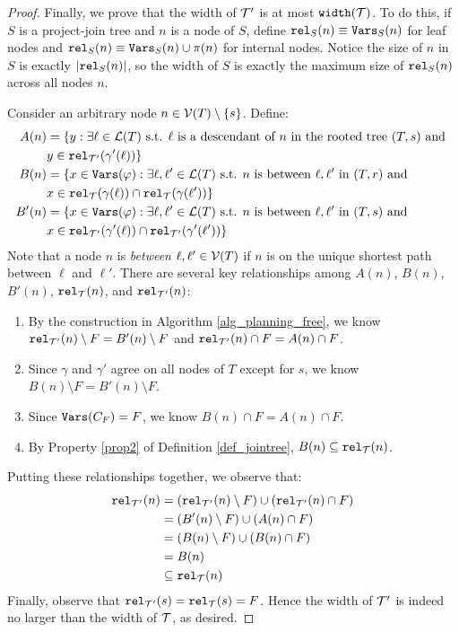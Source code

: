 \begin{proof}
Finally, we prove that the width of $\mathcal{T}'$ is at most $\texttt{\upshape width}(\mathcal{T})$. 
To do this, if $S$ is a project-join tree and $n$ is a node of $S$, define $\texttt{\upshape rel}_S(n) \equiv \texttt{\upshape Vars}_S(n)$ for leaf nodes and $\texttt{\upshape rel}_S(n) \equiv \texttt{\upshape Vars}_S(n) \cup \pi(n)$ for internal nodes. Notice the size of $n$ in $S$ is exactly $|\texttt{\upshape rel}_S(n)|$, so the width of $S$ is exactly the maximum size of $\texttt{\upshape rel}_S(n)$ across all nodes $n$. 

Consider an arbitrary node $n \in \mathcal{V}(T) \setminus \{s\}$. Define:
\begin{align*}
    A(n) &= \{ y : \exists \ell \in \mathcal{L}(T) \text{ s.t. $\ell$ is a descendant of $n$ in the rooted tree $(T, s)$ and } \\&y \in \texttt{\upshape rel}_{\mathcal{T}'}(\gamma'(\ell)) \} \\
    B(n) &= \{ x \in \texttt{\upshape Vars}(\varphi) : \exists \ell, \ell' \in \mathcal{L}(T) \text{ s.t. $n$ is between $\ell, \ell'$ in $(T, r)$ and } \\&x \in \texttt{\upshape rel}_{\mathcal{T}}(\gamma(\ell)) \cap \texttt{\upshape rel}_{\mathcal{T}}(\gamma(\ell')) \} \\
    B'(n) &= \{ x \in \texttt{\upshape Vars}(\varphi) : \exists \ell, \ell' \in \mathcal{L}(T) \text{ s.t. $n$ is between $\ell, \ell'$ in $(T, s)$ and } \\&x \in \texttt{\upshape rel}_{\mathcal{T}'}(\gamma'(\ell)) \cap \texttt{\upshape rel}_{\mathcal{T}'}(\gamma'(\ell')) \}
\end{align*}
Note that a node $n$ is \emph{between} $\ell, \ell' \in \mathcal{V}(T)$ if $n$ is on the unique shortest path between $\ell$ and $\ell'$. There are several key relationships among $A(n)$, $B(n)$, $B'(n)$, $\texttt{\upshape rel}_{\mathcal{T}}(n)$, and $\texttt{\upshape rel}_{\mathcal{T}'}(n)$: 
\begin{enumerate}
    \item By the construction in Algorithm \ref{alg_planning_free}, we know $\texttt{\upshape rel}_{\mathcal{T}'}(n) \setminus F = B'(n) \setminus F$ and $\texttt{\upshape rel}_{\mathcal{T}'}(n) \cap F = A(n) \cap F$.
    \item Since $\gamma$ and $\gamma'$ agree on all nodes of $T$ except for $s$, we know $B(n) \setminus F = B'(n) \setminus F$.
    \item Since $\texttt{\upshape Vars}(C_F) = F$, we know $B(n) \cap F = A(n) \cap F$.
    \item By Property \ref{prop2} of Definition \ref{def_jointree}, $B(n) \subseteq \texttt{\upshape rel}_{\mathcal{T}}(n)$. 
\end{enumerate}
Putting these relationships together, we observe that:
\begin{align*}
    \texttt{\upshape rel}_{\mathcal{T}'}(n) &= (\texttt{\upshape rel}_{\mathcal{T}'}(n) \setminus F) \cup (\texttt{\upshape rel}_{\mathcal{T}'}(n) \cap F) \\
    &= (B'(n) \setminus F) \cup (A(n) \cap F) \\
    &= (B(n) \setminus F) \cup (B(n) \cap F) \\
    &= B(n) \\
    &\subseteq \texttt{\upshape rel}_{\mathcal{T}}(n)
\end{align*}
Finally, observe that $\texttt{\upshape rel}_{\mathcal{T}'}(s) = \texttt{\upshape rel}_{\mathcal{T}}(s) = F$.
Hence the width of $\mathcal{T}'$ is indeed no larger than the width of $\mathcal{T}$, as desired.
\end{proof}

